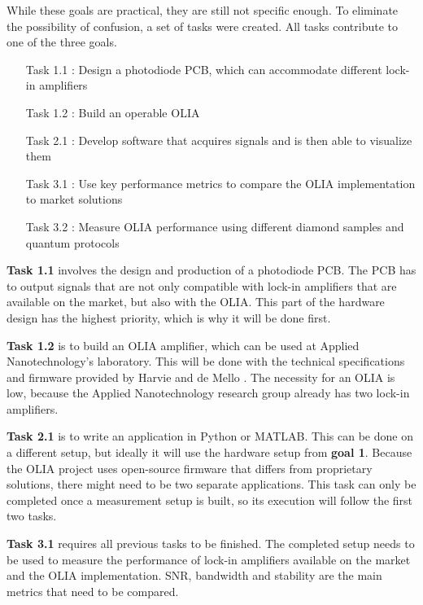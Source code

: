 \documentclass{report}
\begin{document}
	While these goals are practical, they are still not specific enough. To eliminate the possibility of confusion, a set of tasks were created. All tasks contribute to one of the three goals.
	
	\begin{itemize}
		\item[Task 1.1]: Design a photodiode PCB, which can accommodate different lock-in amplifiers
		\item[Task 1.2]: Build an operable OLIA
		\item[Task 2.1]: Develop software that acquires signals and is then able to visualize them
		\item[Task 3.1]: Use key performance metrics to compare the OLIA implementation to market solutions
		\item[Task 3.2]: Measure OLIA performance using different diamond samples and quantum protocols
	\end{itemize}
	
	\textbf{Task 1.1} involves the design and production of a photodiode PCB. The PCB has to output signals that are not only compatible with lock-in amplifiers that are available on the market, but also with the OLIA. This part of the hardware design has the highest priority, which is why it will be done first. 
	
	\textbf{Task 1.2} is to build an OLIA amplifier, which can be used at Applied Nanotechnology's laboratory. This will be done with the technical specifications and firmware provided by Harvie and de Mello \cite{harvie2023olia}. The necessity for an OLIA is low, because the Applied Nanotechnology research group already has two lock-in amplifiers.
	
	\textbf{Task 2.1} is to write an application in Python or MATLAB. This can be done on a different setup, but ideally it will use the hardware setup from \textbf{goal 1}. Because the OLIA project uses open-source firmware that differs from proprietary solutions, there might need to be two separate applications. This task can only be completed once a measurement setup is built, so its execution will follow the first two tasks.
	
	
	\textbf{Task 3.1} requires all previous tasks to be finished. The completed setup needs to be used to measure the performance of lock-in amplifiers available on the market and the OLIA implementation. SNR, bandwidth and stability are the main metrics that need to be compared.
	
\end{document}
